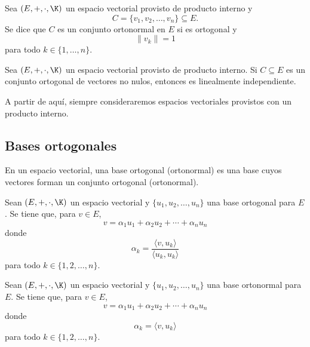 \documentclass[a4,11pt]{aleph-notas}
\begin{document}
\begin{defi}
    Sea $(E,+,\cdot,\K)$ un espacio vectorial provisto de producto interno y
    \[C = \{v_1, v_2, \ldots, v_n\} \subseteq E.\] Se dice que $C$ es un conjunto ortonormal en $E$ si es ortogonal y 
    \[
        \| v_k\| =  1
    \]
    para todo $k \in \{1, \ldots, n\}$.
\end{defi}


\begin{teo}
    Sea $(E,+,\cdot,\K)$ un espacio vectorial provisto de producto interno. Si $C \subseteq E$ es un conjunto ortogonal de vectores no nulos, entonces es linealmente independiente.
\end{teo}


A partir de aquí, siempre consideraremos espacios vectoriales provistos con un producto interno.


\subsection{Bases ortogonales}

\begin{defi}
    En un espacio vectorial, una base ortogonal (ortonormal) es una base cuyos vectores forman un conjunto ortogonal (ortonormal). 
\end{defi}

\begin{teo}
    Sean $(E,+,\cdot,\K)$ un espacio vectorial y $\{u_1, u_2, \ldots, u_n\}$ una base ortogonal para $E$. Se tiene que, para $v \in E$,
    \[
        v = \alpha_1 u_1 + \alpha_2 u_2 +\cdots + \alpha_n u_n
    \]
    donde
    \[
        \alpha_k = \dfrac{\langle v, u_k \rangle}{\langle u_k, u_k \rangle}
    \]
    para todo $k \in \{1, 2, \ldots, n\}$.
\end{teo}


\begin{teo}
    Sean $(E,+,\cdot,\K)$ un espacio vectorial y $\{u_1, u_2, \ldots, u_n\}$ una base ortonormal para $E$. Se tiene que, para $v \in E$,
    \[
        v = \alpha_1 u_1 + \alpha_2 u_2 +\cdots + \alpha_n u_n
    \]
    donde
    \[
        \alpha_k = \langle v, u_k \rangle 
    \]
    para todo $k \in \{1, 2, \ldots, n\}$.
\end{teo}
\end{document}
